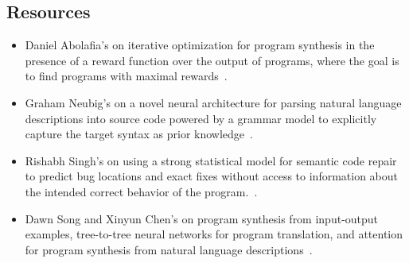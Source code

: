 
\subsection{Resources}

\begin{itemize}
%
\item Daniel Abolafia's {} on iterative optimization for program synthesis in the presence of a reward function over the output of programs, where the goal is to find programs with maximal rewards~\cite{AbolafiaetalCoRR-18}.
%
\item Graham Neubig's {} on a novel neural architecture for parsing natural language descriptions into source code powered by a grammar model to explicitly capture the target syntax as prior knowledge~\cite{YinandNeubigACL-17}.
%
\item Rishabh Singh's {} on using a strong statistical model for semantic code repair to predict bug locations and exact fixes without access to information about the intended correct behavior of the program.~\cite{DevlinetalICLR-18}.
%
\item Dawn Song and Xinyun Chen's {} on program synthesis from input-output examples, tree-to-tree neural networks for program translation, and attention for program synthesis from natural language descriptions~\cite{ChenetalICLR-18b}.
%
\end{itemize}



